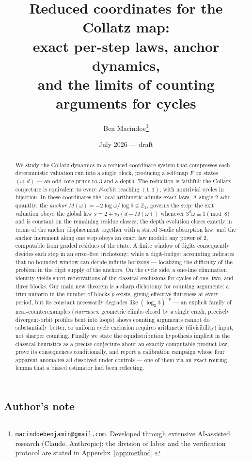 \documentclass[11pt]{article}
\title{Reduced coordinates for the Collatz map:\\ exact per-step laws, anchor dynamics,\\ and the limits of counting arguments for cycles}
\author{Ben Macindoe\thanks{\texttt{macindoebenjamin@gmail.com}. Developed through extensive AI-assisted research (Claude, Anthropic); the division of labor and the verification protocol are stated in Appendix~\ref{app:method}.}}
\date{July 2026 --- draft}
\theoremstyle{remark}
\newcommand{\Z}{\mathbb{Z}}
\newcommand{\vt}[1]{v_2\!\left(#1\right)}
\newcommand{\w}{\omega}
\newcommand{\LL}{\log_2 3}
\begin{document}
\maketitle

\begin{abstract}
We study the Collatz dynamics in a reduced coordinate system that compresses each deterministic valuation run into a single block, producing a self-map $F$ on states $(\w,d)$ --- an odd core prime to $3$ and a depth. The reduction is faithful: the Collatz conjecture is equivalent to every $F$-orbit reaching $(1,1)$, with nontrivial cycles in bijection. In these coordinates the local arithmetic admits exact laws. A single $2$-adic quantity, the \emph{anchor} $M(\w) = -2\log\w/\log 9 \in \Z_2$, governs the step: the exit valuation obeys the global law $s = 2 + \vt{d - M(\w)}$ whenever $3^d\w \equiv 1 \pmod 8$ and is constant on the remaining residue classes; the depth evolution closes exactly in terms of the anchor displacement together with a stated $3$-adic absorption law; and the anchor increment along one step obeys an exact law modulo any power of $2$, computable from graded residues of the state. A finite window of digits consequently decides each step in an error-free trichotomy, while a digit-budget accounting indicates that no bounded window can decide infinite horizons --- localizing the difficulty of the problem in the digit supply of the anchors. On the cycle side, a one-line elimination identity yields short rederivations of the classical exclusions for cycles of one, two, and three blocks. Our main new theorem is a sharp dichotomy for counting arguments: a trim uniform in the number of blocks $p$ exists, giving effective finiteness at every period, but its constant necessarily degrades like $(\LL)^{-p}$ --- an explicit family of near-counterexamples (\emph{staircases}: geometric climbs closed by a single crash, precisely divergent-orbit profiles bent into loops) shows counting arguments cannot do substantially better, so uniform cycle exclusion requires arithmetic (divisibility) input, not sharper counting. Finally we state the equidistribution hypothesis implicit in the classical heuristics as a precise conjecture about an exactly computable product law, prove its consequences conditionally, and report a calibration campaign whose four apparent anomalies all dissolved under controls --- one of them via an exact routing lemma that a biased estimator had been reflecting.
\end{abstract}

\subsection*{Author's note}
\end{document}
